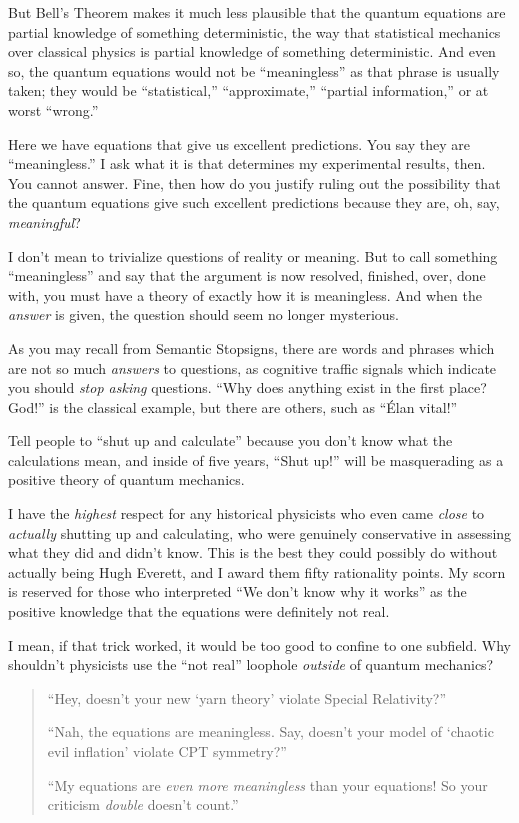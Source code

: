 {
 But Bell's Theorem makes it much less plausible
that the quantum equations are partial knowledge of something
deterministic, the way that statistical mechanics over classical
physics is partial knowledge of something deterministic. And even so,
the quantum equations would not be
``meaningless'' as that phrase is
usually taken; they would be
``statistical,''
``approximate,''
``partial information,'' or at worst
``wrong.''}

{
 Here we have equations that give us excellent predictions. You say
they are ``meaningless.'' I ask what
it is that determines my experimental results, then. You cannot answer.
Fine, then how do you justify ruling out the possibility that the
quantum equations give such excellent predictions because they are, oh,
say, \textit{meaningful}?}

{
 I don't mean to trivialize questions of reality or
meaning. But to call something
``meaningless'' and say that the
argument is now resolved, finished, over, done with, you must have a
theory of exactly how it is meaningless. And when the \textit{answer}
is given, the question should seem no longer mysterious.}

{
 As you may recall from Semantic Stopsigns, there are words and
phrases which are not so much \textit{answers} to questions, as
cognitive traffic signals which indicate you should \textit{stop
asking} questions. ``Why does anything exist in the
first place? God!'' is the classical example, but
there are others, such as ``Élan
vital!''}

{
 Tell people to ``shut up and
calculate'' because you don't know
what the calculations mean, and inside of five years,
``Shut up!'' will be masquerading as
a positive theory of quantum mechanics.}

{
 I have the \textit{highest} respect for any historical physicists
who even came \textit{close} to \textit{actually} shutting up and
calculating, who were genuinely conservative in assessing what they did
and didn't know. This is the best they could possibly
do without actually being Hugh Everett, and I award them fifty
rationality points. My scorn is reserved for those who interpreted
``We don't know why it
works'' as the positive knowledge that the equations
were definitely not real.}

{
 I mean, if that trick worked, it would be too good to confine to
one subfield. Why shouldn't physicists use the
``not real'' loophole
\textit{outside} of quantum mechanics?}

\begin{quotation}
{
 ``Hey, doesn't your new
`yarn theory' violate Special
Relativity?''}

{
 ``Nah, the equations are meaningless. Say,
doesn't your model of `chaotic evil
inflation' violate CPT symmetry?''}

{
 ``My equations are \textit{even more meaningless}
than your equations! So your criticism \textit{double}
doesn't count.''}
\end{quotation}

